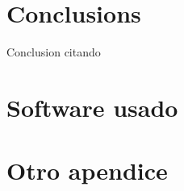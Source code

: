 \documentclass[12pt, american, spanish]{../packages/masterfotonicaucm}
\begin{document}
\lipsum[3-4]

\section{Conclusions}

Conclusion citando~\cite{hadash2018estimate,kour2014real}

\lipsum[5-6]


% 
\printbibliography[]


\cleardoublepage%

\appendix
{}

\appendixpage%
\addappheadtotoc%

\section{Software usado}


\section{Otro apendice}
\end{document}
